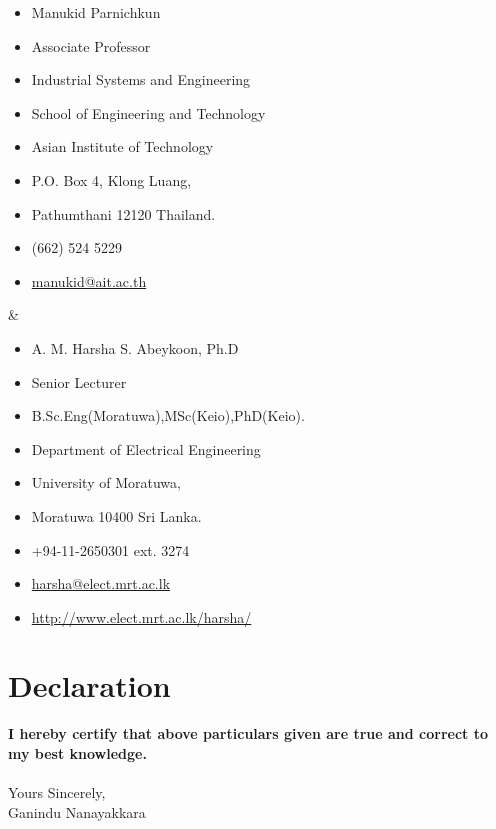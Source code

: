 \documentclass[margin]{res}
\begin{document}
\begin{resume}
\begin{ncolumn}{2}
\begin{itemize} \itemsep -3pt
  \item[] Manukid Parnichkun
  \item[] Associate Professor
  \item[] Industrial Systems and Engineering
  \item[] School of Engineering and Technology
  \item[] Asian Institute of Technology
  \item[] P.O. Box 4, Klong Luang,
  \item[] Pathumthani 12120 Thailand.
  \item[] (662) 524 5229
  \item[] \url{manukid@ait.ac.th}
\end{itemize}
&
\begin{itemize} \itemsep -3pt
  \item[] A. M. Harsha S. Abeykoon, Ph.D
  \item[] Senior Lecturer
  \item[] B.Sc.Eng(Moratuwa),MSc(Keio),PhD(Keio).
  \item[] Department of Electrical Engineering
  \item[] University of Moratuwa,
  \item[] Moratuwa 10400 Sri Lanka.
  \item[] +94-11-2650301 ext. 3274
  \item[] \url{harsha@elect.mrt.ac.lk}
  \item[] \url{http://www.elect.mrt.ac.lk/harsha/}
\end{itemize}
\end{ncolumn}

\section{Declaration}{\bf I hereby certify that above particulars given are true
and correct to my best knowledge.} \\

\phantom \\
Yours Sincerely,\\
Ganindu Nanayakkara








\end{resume}
\end{document}
